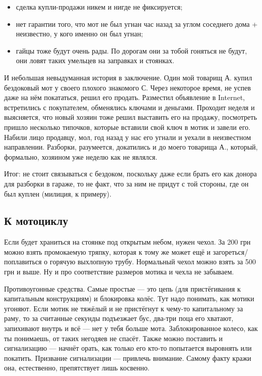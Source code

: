 \documentclass[12pt,a4paper]{article}
\begin{document}
\begin{itemize}
\item сделка купли-продажи никем и нигде не фиксируется;
\item нет гарантии того, что мот не был угнан час назад за углом
соседнего дома + неизвестно, у кого именно он был угнан;
\item гайцы тоже будут очень рады. По дорогам они за тобой гоняться
не будут, они ловят таких умельцев на заправках и стоянках.
\end{itemize}

И небольшая невыдуманная история в заключение. Один мой товарищ А. купил
бездоковый мот у своего плохого знакомого С. Через некоторое время,
не успев даже на нём покататься, решил его продать. Разместил
объявление в Internet, встретились с покупателем, обменялись ключами
и деньгами. Проходит неделя и выясняется, что новый хозяин тоже
решил выставить его на продажу, посмотреть пришло несколько
типочков, которые вставили свой ключ в мотик и завели его. Набили
лицо продавцу, мол, год назад у нас его угнали и уехали в неизвестном
направлении. Разборки, разумеется, докатились и до моего товарища А.,
который, формально, хозяином уже неделю как не являлся.

Итог: не стоит связываться с бездоком, поскольку даже если брать его
как донора для разборки в гараже, то не факт, что за ним не придут с той
стороны, где он был куплен (милиция, к примеру).

\subsection{К мотоциклу}

Если будет храниться на стоянке под открытым небом, нужен чехол. За
200 грн можно взять промокаемую тряпку, которая к тому же может ещё и
загореться/поплавиться о горячую выхлопную трубу. Нормальный чехол
можно взять за 500 грн и выше. Ну и про соответствие размеров мотика
и чехла не забываем.

Противоугонные средства. Самые простые --- это цепь (для пристёгивания
к капитальным конструкциям) и блокировка колёс. Тут надо понимать, как
мотики угоняют. Если мотик не тяжёлый и не пристёгнут к чему-то
капитальному за раму, то за считанные секунды подъезжает бус, два-три
поца его хватают, запихивают внутрь и всё --- нет у тебя больше мота.
Заблокированное колесо, как ты понимаешь, от таких негодяев не спасёт.
Также можно поставить и сигнализацию --- начнёт орать, как только его
кто-то попытается выровнять или покатить. Призвание сигнализации ---
привлечь внимание. Самому факту кражи она, естественно, препятствует
лишь косвенно.
\end{document}
